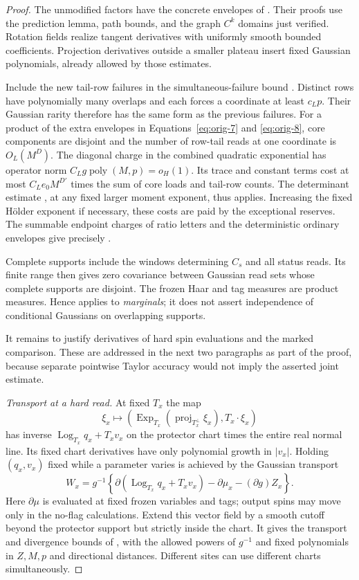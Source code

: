 \begin{proof}
The unmodified factors have the concrete envelopes of
.  Their proofs use the prediction lemma,
path bounds, and the graph $C^k$ domains just verified.  Rotation
fields realize tangent derivatives with uniformly smooth bounded
coefficients.  Projection derivatives outside a smaller plateau
insert fixed Gaussian polynomials, already allowed by those estimates.

Include the new tail-row failures in the simultaneous-failure bound
.  Distinct rows have polynomially many overlaps
and each forces a coordinate at least $c_Lp$.  Their Gaussian rarity
therefore has the same form as the previous failures.  For a product
of the extra envelopes in Equations~\eqref{eq:orig-7} and
\eqref{eq:orig-8}, core components are disjoint and the number of
row-tail reads at one coordinate is $O_L(M^D)$.  The diagonal charge
in the combined quadratic exponential has operator norm
$C_Lg\operatorname{poly}(M,p)=o_H(1)$.  Its trace and constant terms
cost at most $C_Le_0M^{D'}$ times the sum of core loads and tail-row
counts.  The determinant estimate , at
any fixed larger moment exponent, thus applies.  Increasing the
fixed H\"older exponent if necessary, these costs are paid by the
exceptional reserves.  The summable endpoint charges of ratio letters
and the deterministic ordinary envelopes give precisely
.

Complete supports include the windows determining $C_s$ and all
status reads.  Its finite range then gives zero covariance between
Gaussian read sets whose complete supports are disjoint.  The frozen
Haar and tag measures are product measures.  Hence
 applies to \emph{marginals}; it does not
assert independence of conditional Gaussians on overlapping supports.

It remains to justify derivatives of hard spin evaluations and the
marked comparison.  These are addressed in the next two paragraphs
as part of the proof, because separate pointwise Taylor accuracy
would not imply the asserted joint estimate.

\emph{Transport at a hard read.}
At fixed $T_x$ the map
\[
 \xi_x\longmapsto
 \left(\operatorname{Exp}_{T_x}
             (\operatorname{proj}_{T_x^\perp}\xi_x),
                              T_x\cdot\xi_x\right)
\]
has inverse
$\operatorname{Log}_{T_x}q_x+T_xv_x$ on the protector chart times
the entire real normal line.  Its fixed chart derivatives have only
polynomial growth in $|v_x|$.  Holding $(q_x,v_x)$ fixed while a
parameter varies is achieved by the Gaussian transport
\[
 W_x=g^{-1}\left\{
    \partial(\operatorname{Log}_{T_x}q_x+T_xv_x)
                 -\partial\mu_x-(\partial g)Z_x\right\}.
\]
Here $\partial\mu$ is evaluated at fixed frozen variables and tags;
output spins may move only in the no-flag calculations.  Extend this
vector field by a smooth cutoff beyond the protector support but
strictly inside the chart.  It gives the transport and divergence
bounds of , with the allowed powers of $g^{-1}$
and fixed polynomials in $Z,M,p$ and directional distances.
Different sites can use different charts simultaneously.


\end{proof}
